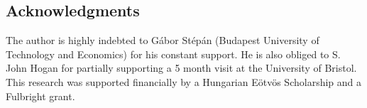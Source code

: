 \documentclass[10pt,a4paper]{ddedoc}
\begin{document}
\subsection*{Acknowledgments}

The author is highly indebted to G\'abor St\'ep\'an (Budapest University of 
Technology and Economics) for his constant support. He is also
obliged to S. John Hogan for partially supporting a 5 month visit at the University of Bristol.
This research was supported financially by a 
Hungarian E\"otv\"os Scholarship and a Fulbright grant.


 \label{sec:bibliography}
\end{document}
